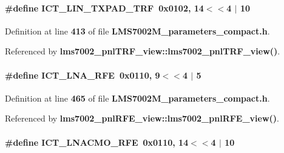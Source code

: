 \paragraph[{I\+C\+T\+\_\+\+L\+I\+N\+\_\+\+T\+X\+P\+A\+D\+\_\+\+T\+RF}]{\setlength{\rightskip}{0pt plus 5cm}\#define I\+C\+T\+\_\+\+L\+I\+N\+\_\+\+T\+X\+P\+A\+D\+\_\+\+T\+RF~0x0102, 14$<$$<$4 $\vert$  10}\label{LMS7002M__parameters__compact_8h_ac0b0551f694b35f92742742352990ca4}


Definition at line {\bf 413} of file {\bf L\+M\+S7002\+M\+\_\+parameters\+\_\+compact.\+h}.



Referenced by {\bf lms7002\+\_\+pnl\+T\+R\+F\+\_\+view\+::lms7002\+\_\+pnl\+T\+R\+F\+\_\+view()}.

\paragraph[{I\+C\+T\+\_\+\+L\+N\+A\+\_\+\+R\+FE}]{\setlength{\rightskip}{0pt plus 5cm}\#define I\+C\+T\+\_\+\+L\+N\+A\+\_\+\+R\+FE~0x0110, 9$<$$<$4 $\vert$  5}\label{LMS7002M__parameters__compact_8h_a87b1ccc0bc17768317222ab6e1d503e6}


Definition at line {\bf 465} of file {\bf L\+M\+S7002\+M\+\_\+parameters\+\_\+compact.\+h}.



Referenced by {\bf lms7002\+\_\+pnl\+R\+F\+E\+\_\+view\+::lms7002\+\_\+pnl\+R\+F\+E\+\_\+view()}.

\paragraph[{I\+C\+T\+\_\+\+L\+N\+A\+C\+M\+O\+\_\+\+R\+FE}]{\setlength{\rightskip}{0pt plus 5cm}\#define I\+C\+T\+\_\+\+L\+N\+A\+C\+M\+O\+\_\+\+R\+FE~0x0110, 14$<$$<$4 $\vert$  10}\label{LMS7002M__parameters__compact_8h_ad465eb19b6171d805fd883b1a14b2ad6}


